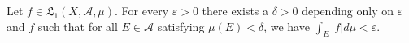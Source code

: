 Let $f \in \mathfrak{L}_1(X, \mathcal{A}, \mu)$. For every $\varepsilon > 0$ there exists a $\delta > 0$ depending only on $\varepsilon$ and $f$ such that for all $E \in \mathcal{A}$ satisfying $\mu(E) < \delta$, we have $\int_E |f| d\mu < \varepsilon$.
